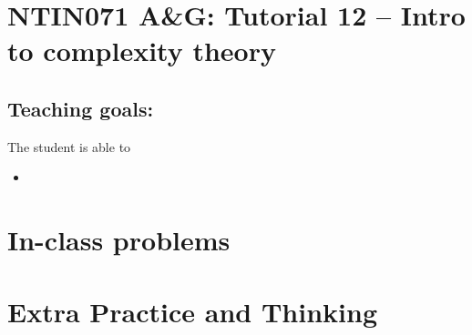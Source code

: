 \documentclass[a4paper,12pt]{amsart}
\begin{document}
\thispagestyle{empty}

\section*{NTIN071 A\&G: Tutorial 12 -- Intro to complexity theory}

\medskip

\subsection*{Teaching goals:} The student is able to

    \begin{itemize}\setlength{\itemsep}{0pt}
        \item 
    \end{itemize}


\section*{In-class problems}


\medskip\begin{problem}

\end{problem}


\section*{Extra Practice and Thinking}


\medskip\begin{problem}

\end{problem}
\end{document}
